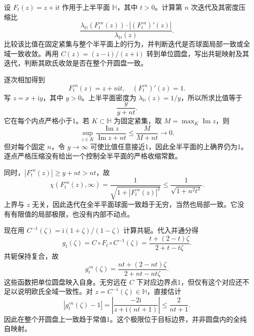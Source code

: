 \begin{exercise}\label{b3:ex:06-6}
设 \(F_t(z)=z+\mathrm{i}t\) 作用于上半平面 \(\mathbb H\)，其中 \(t>0\)。计算第 \(n\) 次迭代及其密度压缩比
\[
 \frac{\lambda_{\mathbb H}(F_t^{\circ n}(z))
       \cdot|(F_t^{\circ n})'(z)|}{\lambda_{\mathbb H}(z)}.
\]
比较该比值在固定紧集与整个半平面上的行为，并判断迭代是否球面局部一致或全域一致收敛。再用 \(C(z)=(z-\mathrm{i})/(z+\mathrm{i})\) 转到单位圆盘，写出共轭映射及其迭代，判断其欧氏收敛是否在整个开圆盘一致。
\end{exercise}
\begin{solution}
逐次相加得到
\[
 F_t^{\circ n}(z)=z+n\mathrm{i}t,\quad
 (F_t^{\circ n})'(z)=1.
\]
写 \(z=x+\mathrm{i}y\)，其中 \(y>0\)。上半平面密度为 \(\lambda_{\mathbb H}(z)=1/y\)，所以所求比值等于
\[
 \frac{y}{y+nt}.
\]
它在每个内点严格小于1。若 \(K\subset\mathbb H\) 为固定紧集，取 \(M=\max_K\operatorname{Im}z\)，则
\[
 \sup_{z\in K}\frac{\operatorname{Im}z}{\operatorname{Im}z+nt}
 \le\frac{M}{M+nt}\longrightarrow0.
\]
但对每个固定 \(n\)，令 \(y\to\infty\) 可使比值任意接近1，因此全半平面的上确界仍为1。逐点严格压缩没有给出一个控制全半平面的严格收缩常数。

同时，\(|F_t^{\circ n}(z)|\ge y+nt>nt\)，故
\[
 \chi(F_t^{\circ n}(z),\infty)
 =\frac1{\sqrt{1+|F_t^{\circ n}(z)|^2}}
 \le\frac1{\sqrt{1+n^2t^2}}.
\]
上界与 \(z\) 无关，因此迭代在全半平面球面一致趋于无穷，当然也局部一致。它没有有限值的局部极限，也没有内部不动点。

现在用 \(C^{-1}(\zeta)=\mathrm{i}(1+\zeta)/(1-\zeta)\) 计算共轭。代入并通分得
\[
 g_t(\zeta)=C\circ F_t\circ C^{-1}(\zeta)
 =\frac{t+(2-t)\zeta}{2+t-t\zeta}.
\]
共轭保持复合，故
\[
 g_t^{\circ n}(\zeta)
 =\frac{nt+(2-nt)\zeta}{2+nt-nt\zeta}.
\]
这些函数把单位圆盘映入自身。无穷远在 \(C\) 下对应边界点1，但仅有这个对应还不足以说明欧氏全域一致性。对 \(z=C^{-1}(\zeta)\in\mathbb H\)，直接估计
\[
 |g_t^{\circ n}(\zeta)-1|
 =\left|\frac{-2\mathrm{i}}{z+\mathrm{i}(nt+1)}\right|
 \le\frac2{nt+1}.
\]
因此在整个开圆盘上一致趋于常值1。这个极限位于目标边界，并非圆盘内的全纯自映射。
\end{solution}

